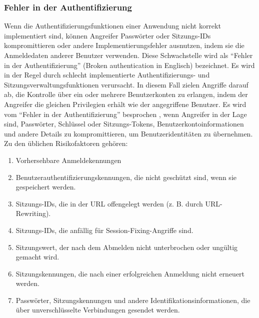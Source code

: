 \subsubsection{Fehler in der Authentifizierung}

Wenn die Authentifizierungsfunktionen  einer Anwendung nicht korrekt
implementiert sind, können Angreifer Passwörter oder Sitzungs-IDs
kompromittieren oder andere Implementierungsfehler ausnutzen, indem
sie die Anmeldedaten anderer Benutzer verwenden. Diese Schwachstelle
wird als ``Fehler in der Authentifizierung'' (Broken authentication
in Englisch) bezeichnet. Es wird in der Regel durch schlecht
implementierte Authentifizierungs- und Sitzungsverwaltungsfunktionen
verursacht. In diesem Fall  zielen Angriffe darauf ab, die Kontrolle
über ein oder mehrere Benutzerkonten zu erlangen, indem der Angreifer
die gleichen Privilegien erhält wie der angegriffene Benutzer.
Es wird vom ``Fehler in der Authentifizierung'' besprochen ,
wenn Angreifer in der Lage sind, Passwörter, Schlüssel oder
Sitzungs-Tokens, Benutzerkontoinformationen und andere
Details zu kompromittieren, um Benutzeridentitäten zu übernehmen.
Zu den üblichen Risikofaktoren gehören:


\begin{enumerate}
    \item Vorhersehbare Anmeldekennungen
    \item Benutzerauthentifizierungskennungen, die nicht geschützt sind, wenn sie gespeichert werden.
    \item Sitzungs-IDs, die in der URL offengelegt werden (z. B. durch URL-Rewriting).
    \item Sitzungs-IDs, die anfällig für Session-Fixing-Angriffe sind.
    \item Sitzungswert, der nach dem Abmelden nicht unterbrochen oder ungültig gemacht wird.
    \item Sitzungskennungen, die nach einer erfolgreichen Anmeldung nicht erneuert werden.
    \item Passwörter, Sitzungskennungen und andere Identifikationsinformationen, die über unverschlüsselte Verbindungen gesendet werden.
\end{enumerate}